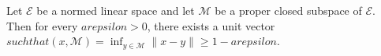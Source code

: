 Let $\mathcal{E}$ be a normed linear space and let $\mathcal{M}$ be a proper closed subspace of $\mathcal{E}$. Then for every $arepsilon > 0$, there exists a unit vector  \in {}$ such that (x, \mathcal{M}) = \inf_{y \in \mathcal{M}} \|x - y\| \geq 1 - arepsilon$.
